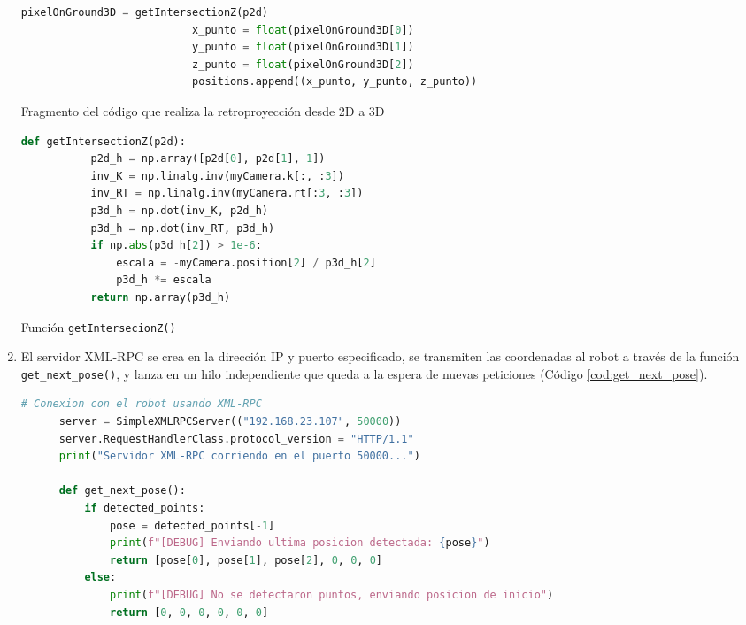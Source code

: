 \begin{enumerate}
    \begin{code}[H]
      \begin{lstlisting}[language=Python] 
                           pixelOnGround3D = getIntersectionZ(p2d)
                           x_punto = float(pixelOnGround3D[0])
                           y_punto = float(pixelOnGround3D[1])
                           z_punto = float(pixelOnGround3D[2])
                           positions.append((x_punto, y_punto, z_punto)) 
      \end{lstlisting}
      \caption{Fragmento del código que realiza la retroproyección desde 2D a 3D}
      \label{cod:2D_a_3D}
    \end{code}                   
       
    \begin{code}[H]
      \begin{lstlisting}[language=Python]      
      def getIntersectionZ(p2d):
           p2d_h = np.array([p2d[0], p2d[1], 1])
           inv_K = np.linalg.inv(myCamera.k[:, :3])
           inv_RT = np.linalg.inv(myCamera.rt[:3, :3])
           p3d_h = np.dot(inv_K, p2d_h)
           p3d_h = np.dot(inv_RT, p3d_h)
           if np.abs(p3d_h[2]) > 1e-6:
               escala = -myCamera.position[2] / p3d_h[2]
               p3d_h *= escala
           return np.array(p3d_h)
      \end{lstlisting}
      \caption{Función \texttt{getIntersecionZ()}}
      \label{cod:getIntersectionZ}
    \end{code}                                    
                           
  \item El servidor XML-RPC se crea en la dirección IP y puerto especificado, se transmiten las coordenadas al robot a través de la función \texttt{get\_next\_pose()}, y lanza en un hilo independiente que queda a la espera de nuevas peticiones (Código \ref{cod:get_next_pose}).
  
    \begin{code}[H]
      \begin{lstlisting}[language=Python] 
      # Conexion con el robot usando XML-RPC
      server = SimpleXMLRPCServer(("192.168.23.107", 50000))
      server.RequestHandlerClass.protocol_version = "HTTP/1.1"
      print("Servidor XML-RPC corriendo en el puerto 50000...")
      
      def get_next_pose():
          if detected_points:
              pose = detected_points[-1]
              print(f"[DEBUG] Enviando ultima posicion detectada: {pose}")
              return [pose[0], pose[1], pose[2], 0, 0, 0]
          else:
              print(f"[DEBUG] No se detectaron puntos, enviando posicion de inicio")
              return [0, 0, 0, 0, 0, 0]


\end{lstlisting}
\end{code}
\end{enumerate}
